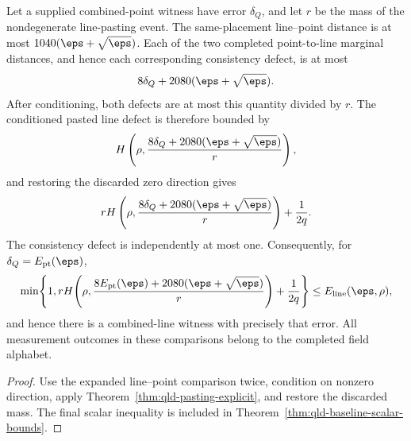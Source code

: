 \begin{theorem}
\label{thm:qld-combined-lines-explicit}
\leanok
{}
Let a supplied combined-point witness have error $\delta_Q$, and let $r$ be
the mass of the nondegenerate line-pasting event.  The same-placement
line--point distance is at most $1040(\eps+\sqrt\eps)$.  Each of the two
completed point-to-line marginal distances, and hence each corresponding
consistency defect, is at most
\[
  8\delta_Q+2080(\eps+\sqrt\eps).
\]
After conditioning, both defects are at most this quantity divided by $r$.
The conditioned pasted line defect is therefore bounded by
\[
 H\left(\rho,\frac{8\delta_Q+2080(\eps+\sqrt\eps)}{r}\right),
\]
and restoring the discarded zero direction gives
\[
 rH\left(\rho,\frac{8\delta_Q+2080(\eps+\sqrt\eps)}{r}\right)
   +\frac1{2q}.
\]
The consistency defect is independently at most one.  Consequently, for
$\delta_Q=E_{\mathrm{pt}}(\eps)$,
\[
 \min\!\left\{1,
 rH\!\left(\rho,\frac{8E_{\mathrm{pt}}(\eps)
   +2080(\eps+\sqrt\eps)}{r}\right)+\frac1{2q}\right\}
 \leq E_{\mathrm{line}}(\eps,\rho),
\]
and hence there is a combined-line witness with precisely that error.  All
measurement outcomes in these comparisons belong to the completed field
alphabet.
\end{theorem}
\begin{proof}
\leanok
{}
Use the expanded line--point comparison twice, condition on nonzero direction,
apply Theorem~\ref{thm:qld-pasting-explicit}, and restore the discarded mass.
The final scalar inequality is included in
Theorem~\ref{thm:qld-baseline-scalar-bounds}.
\end{proof}

